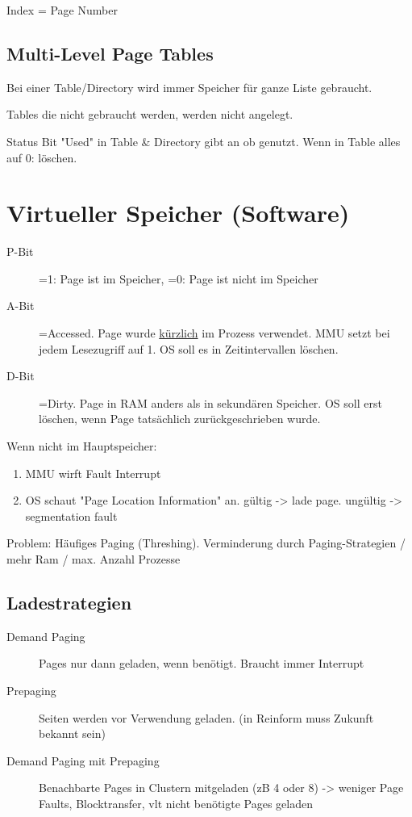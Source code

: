 \begin{multicols*}{4}
Index = Page Number

\subsection{Multi-Level Page Tables}
Bei einer Table/Directory wird immer Speicher für ganze Liste gebraucht.

Tables die nicht gebraucht werden, werden nicht angelegt.

Status Bit "Used" in Table \& Directory gibt an ob genutzt. Wenn in Table alles auf 0: löschen.

\section{Virtueller Speicher (Software)}
\begin{description}
    \item[P-Bit] =1: Page ist im Speicher, =0: Page ist nicht im Speicher
    \item[A-Bit] =Accessed. Page wurde \underline{kürzlich} im Prozess verwendet. MMU setzt bei jedem Lesezugriff auf 1. OS soll es in Zeitintervallen löschen.
    \item[D-Bit] =Dirty. Page in RAM anders als in sekundären Speicher. OS soll erst löschen, wenn Page tatsächlich zurückgeschrieben wurde.
\end{description}
\vspace{2pt}
Wenn nicht im Hauptspeicher:
\begin{enumerate}
    \item MMU wirft Fault Interrupt
    \item OS schaut "Page Location Information" an. gültig -> lade page. ungültig -> segmentation fault
\end{enumerate}

Problem: Häufiges Paging (Threshing). Verminderung durch Paging-Strategien / mehr Ram / max. Anzahl Prozesse

\subsection{Ladestrategien}
\begin{description}
    \item[Demand Paging] Pages nur dann geladen, wenn benötigt. Braucht immer Interrupt
    \item[Prepaging] Seiten werden vor Verwendung geladen. (in Reinform muss Zukunft bekannt sein)
    \item[Demand Paging mit Prepaging] Benachbarte Pages in Clustern mitgeladen (zB 4 oder 8)
    -> weniger Page Faults, Blocktransfer, vlt nicht benötigte Pages geladen
\end{description}


\end{multicols*}
